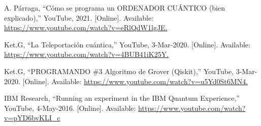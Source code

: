 \documentclass{article}
\begin{document}
\begin{thebibliography}{9}

 \label{ref:vidIntro} A. Párraga, “Cómo se programa un ORDENADOR CUÁNTICO (bien explicado),”
YouTube, 2021. [Online]. Available: \url{https://www.youtube.com/watch?v=eRlQdW1lgJE. }

 \label{ref:vidTelepor} Ket.G, “La Teleportación cuántica,” YouTube, 3-Mar-2020. [Online]. 
Available: \url{https://www.youtube.com/watch?v=4BUB41iK25Y.}

 \label{ref:Grover} Ket.G, “PROGRAMANDO \#3 Algoritmo de Grover (Qiskit),” YouTube, 3-Mar-2020. 
[Online]. Available: \url{https://www.youtube.com/watch?v=u5Yd0St6MN4.}

 \label{ref:IBMQuant} IBM Research, “Running an experiment in the IBM Quantum Experience,” 
YouTube, 4-May-2016. [Online]. 
Available: \url{https://www.youtube.com/watch?v=pYD6bvKLI_c}

\end{thebibliography}
\end{document}
